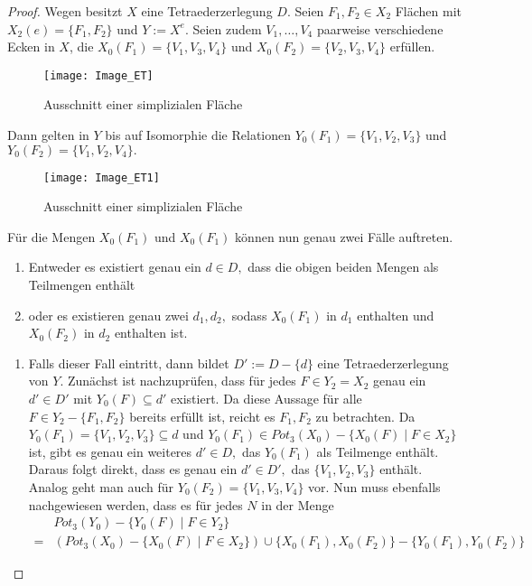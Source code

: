 \documentclass[12pt,titlepage,twoside,cleardoublepage]{article}
\theoremstyle{nummermitklammern}
\numberwithin{equation}{section}
\begin{document}
 \begin{proof}
 Wegen  besitzt $X$ eine Tetraederzerlegung $D.$ Seien $F_1,F_2\in X_2$ Flächen mit $X_2(e)=\{F_1,F_2\}$ und $Y:=X^e.$ Seien zudem $V_1,\ldots,V_4$ paarweise verschiedene Ecken in $X$, die $X_0(F_1)=\{V_1,V_3,V_4\}$ und $X_0(F_2)=\{V_2,V_3,V_4\}$ erfüllen.
 \begin{figure}[H]
\begin{center}
\texttt{[image: Image\_ET]}
\end{center}
\caption{Ausschnitt einer simplizialen Fläche}
\end{figure}
 
 Dann gelten in $Y$ bis auf Isomorphie die Relationen ${Y}_0(F_1)=\{V_1,V_2,V_3\}$ und ${Y}_0(F_2)=\{V_1,V_2,V_4\}.$
 \begin{figure}[H]
\begin{center}
\texttt{[image: Image\_ET1]}
\end{center}
\caption{Ausschnitt einer simplizialen Fläche}
\end{figure}
Für die Mengen ${X}_0(F_1)$ und ${X}_0(F_1)$ können nun genau zwei Fälle auftreten.
\begin{enumerate}
\item Entweder es existiert genau ein $d\in D,$ dass die obigen beiden Mengen als Teilmengen enthält
\item oder es existieren genau zwei $d_1,d_2,$ sodass $X_0(F_1)$ in $d_1$ enthalten und $X_0(F_2)$ in $d_2$ enthalten ist.
\end{enumerate}
\begin{enumerate}
\item Falls dieser Fall eintritt, dann bildet $D':=D-\{d\}$ eine Tetraederzerlegung von $Y.$ Zunächst ist nachzuprüfen, dass für jedes $F\in {Y}_2=X_2$ genau ein $d'\in D'$ mit ${Y}_0(F)\subseteq d'$ existiert. Da diese Aussage für alle $F\in Y_2-\{ F_1,F_2\}$ bereits erfüllt ist, reicht es $F_1,F_2$ zu betrachten. Da ${Y}_0(F_1)=\{V_1,V_2,V_3\}\subseteq d$ und  $Y_0(F_1) \in Pot_3(X_0)-\{X_0(F)\mid F\in X_2\}$ ist, gibt es genau ein weiteres $d'\in D,$ das ${Y}_0(F_1)$ als Teilmenge enthält. Daraus folgt direkt, dass es genau ein $d'\in D',$ das $\{V_1,V_2,V_3\}$ enthält. Analog geht man auch für ${Y}_0(F_2)=\{V_1,V_3,V_4\}$ vor.
Nun muss ebenfalls nachgewiesen werden, dass es für jedes $N$ in der Menge 
\begin{align*}
 &Pot_3({Y}_0)-\{{Y}_0(F)\mid F\in {Y}_2\}\\
 =& (Pot_3({X}_0)-\{{X}_0(F)\mid F\in {X}_2\})\cup \{X_0(F_1),X_0(F_2)\}-\{{Y}_0(F_1),{Y}_0(F_2)\}

\end{align*}
\end{enumerate}
\end{proof}
\end{document}
